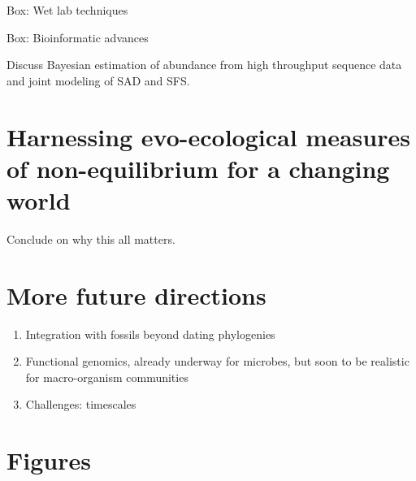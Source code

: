 \documentclass[12pt]{article}
\begin{document}
Box: Wet lab techniques

Box: Bioinformatic advances

Discuss Bayesian estimation of abundance from high throughput sequence
data and joint modeling of SAD and SFS.

\section{Harnessing evo-ecological measures of non-equilibrium for a changing world}

Conclude on why this all matters.

\section{More future directions}

\begin{enumerate}
\item Integration with fossils beyond dating phylogenies
\item Functional genomics, already underway for microbes, but soon to
  be realistic for macro-organism communities
\item Challenges: timescales
\end{enumerate}

\pagebreak

\section*{Figures}
\end{document}
